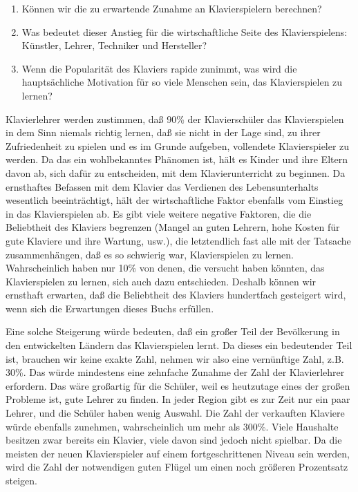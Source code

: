 \begin{enumerate} 
 \item Können wir die zu erwartende Zunahme an Klavierspielern berechnen?
 \item Was bedeutet dieser Anstieg für die wirtschaftliche Seite des Klavierspielens: Künstler, Lehrer, Techniker und Hersteller?
 \item Wenn die Popularität des Klaviers rapide zunimmt, was wird die hauptsächliche Motivation für so viele Menschen sein, das Klavierspielen zu lernen?
\end{enumerate}
Klavierlehrer werden zustimmen, daß 90\% der Klavierschüler das Klavierspielen in dem Sinn niemals richtig lernen, daß sie nicht in der Lage sind, zu ihrer Zufriedenheit zu spielen und es im Grunde aufgeben, vollendete Klavierspieler zu werden.
Da das ein wohlbekanntes Phänomen ist, hält es Kinder und ihre Eltern davon ab, sich dafür zu entscheiden, mit dem Klavierunterricht zu beginnen.
Da ernsthaftes Befassen mit dem Klavier das Verdienen des Lebensunterhalts wesentlich beeinträchtigt, hält der wirtschaftliche Faktor ebenfalls vom Einstieg in das Klavierspielen ab.
Es gibt viele weitere negative Faktoren, die die Beliebtheit des Klaviers begrenzen (Mangel an guten Lehrern, hohe Kosten für gute Klaviere und ihre Wartung, usw.),
die letztendlich fast alle mit der Tatsache zusammenhängen, daß es so schwierig war, Klavierspielen zu lernen.
Wahrscheinlich haben nur 10\% von denen, die versucht haben könnten, das Klavierspielen zu lernen, sich auch dazu entschieden.
Deshalb können wir ernsthaft erwarten, daß die Beliebtheit des Klaviers hundertfach gesteigert wird, wenn sich die Erwartungen dieses Buchs erfüllen.

Eine solche Steigerung würde bedeuten, daß ein großer Teil der Bevölkerung in den entwickelten Ländern das Klavierspielen lernt.
Da dieses ein bedeutender Teil ist, brauchen wir keine exakte Zahl, nehmen wir also eine vernünftige Zahl, z.B. 30\%.
Das würde mindestens eine zehnfache Zunahme der Zahl der Klavierlehrer erfordern.
Das wäre großartig für die Schüler, weil es heutzutage eines der großen Probleme ist, gute Lehrer zu finden.
In jeder Region gibt es zur Zeit nur ein paar Lehrer, und die Schüler haben wenig Auswahl.
Die Zahl der verkauften Klaviere würde ebenfalls zunehmen, wahrscheinlich um mehr als 300\%.
Viele Haushalte besitzen zwar bereits ein Klavier, viele davon sind jedoch nicht spielbar.
Da die meisten der neuen Klavierspieler auf einem fortgeschrittenen Niveau sein werden, wird die Zahl der notwendigen guten Flügel um einen noch größeren Prozentsatz steigen.

